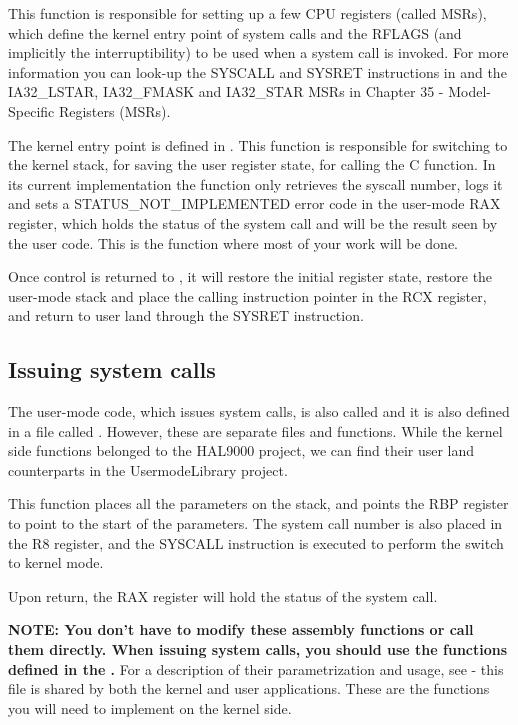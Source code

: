 This function is responsible for setting up a few CPU registers (called MSRs), which define the kernel
entry point of system calls and the RFLAGS (and implicitly the interruptibility) to be used when a 
system call is invoked. For more information you can look-up the SYSCALL and SYSRET instructions in
\cite{intelInstr} and the IA32\_LSTAR, IA32\_FMASK and IA32\_STAR MSRs in \cite{intelSys} Chapter 35
 - Model-Specific Registers (MSRs).

The kernel entry point is  defined in . This function is 
responsible for switching to the kernel stack, for saving the user register state, for calling the C
  function. In its current implementation the function only retrieves the
syscall number, logs it and sets a STATUS\_NOT\_IMPLEMENTED error code in the user-mode RAX register,
which holds the status of the system call and will be the result seen by the user code. This is the
function where most of your work will be done.

Once control is returned to , it will restore the initial register state, restore
the user-mode stack and place the calling instruction pointer in the RCX register, and return to user
land through the SYSRET instruction.

\subsection{Issuing system calls}

The user-mode code, which issues system calls, is also called  and it is also
defined in a file called . However, these are separate files and functions.
While the kernel side functions belonged to the HAL9000 project, we can find their user land
counterparts in the UsermodeLibrary project.

This function places all the parameters on the stack, and points the RBP register to point to the
start of the parameters. The system call number is also placed in the R8 register, and the SYSCALL
instruction is executed to perform the switch to kernel mode.

Upon return, the RAX register will hold the status of the system call.

\textbf{NOTE: You don't have to modify these assembly functions or call them directly. When issuing
system calls, you should use the functions defined in the .} For a description
of their parametrization and usage, see  - this file is shared by both the
kernel and user applications. These are the functions you will need to implement on the kernel
side.


